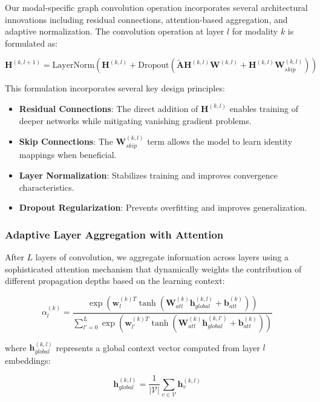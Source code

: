 \documentclass[pdflatex,sn-mathphys-num]{sn-jnl}%
\theoremstyle{thmstyleone}%
\theoremstyle{thmstyletwo}%
\theoremstyle{thmstylethree}%
\begin{document}
Our modal-specific graph convolution operation incorporates several architectural innovations including residual connections, attention-based aggregation, and adaptive normalization. The convolution operation at layer $l$ for modality $k$ is formulated as:

\begin{equation}
\mathbf{H}^{(k,l+1)} = \text{LayerNorm}\left(\mathbf{H}^{(k,l)} + \text{Dropout}\left(\tilde{\mathbf{A}} \mathbf{H}^{(k,l)} \mathbf{W}^{(k,l)} + \mathbf{H}^{(k,l)} \mathbf{W}_{skip}^{(k,l)}\right)\right)
\end{equation}

This formulation incorporates several key design principles:
\begin{itemize}
\item \textbf{Residual Connections}: The direct addition of $\mathbf{H}^{(k,l)}$ enables training of deeper networks while mitigating vanishing gradient problems.
\item \textbf{Skip Connections}: The $\mathbf{W}_{skip}^{(k,l)}$ term allows the model to learn identity mappings when beneficial.
\item \textbf{Layer Normalization}: Stabilizes training and improves convergence characteristics.
\item \textbf{Dropout Regularization}: Prevents overfitting and improves generalization.
\end{itemize}

\subsubsection{Adaptive Layer Aggregation with Attention}

After $L$ layers of convolution, we aggregate information across layers using a sophisticated attention mechanism that dynamically weights the contribution of different propagation depths based on the learning context:

\begin{equation}
\alpha_l^{(k)} = \frac{\exp(\mathbf{w}_l^{(k)T} \tanh(\mathbf{W}_{att}^{(k)} \mathbf{h}_{global}^{(k,l)} + \mathbf{b}_{att}^{(k)}))}{\sum_{l'=0}^{L} \exp(\mathbf{w}_{l'}^{(k)T} \tanh(\mathbf{W}_{att}^{(k)} \mathbf{h}_{global}^{(k,l')} + \mathbf{b}_{att}^{(k)}))}
\end{equation}

where $\mathbf{h}_{global}^{(k,l)}$ represents a global context vector computed from layer $l$ embeddings:

\begin{equation}
\mathbf{h}_{global}^{(k,l)} = \frac{1}{|\mathcal{V}|} \sum_{v \in \mathcal{V}} \mathbf{h}_v^{(k,l)}
\end{equation}
\end{document}
